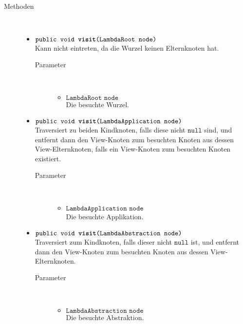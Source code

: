 \begin{description}
\item[Methoden] \hfill \\
	\vspace{-.8cm}
	\begin{itemize}
		\item $\texttt{public void \textbf{visit}(LambdaRoot node)}$ \\ Kann nicht eintreten, da die Wurzel keinen Elternknoten hat.
		\begin{description}
			\item[Parameter] \hfill \\
			\vspace{-.8cm}
			\begin{itemize}
				\item $\texttt{LambdaRoot node}$ \\ Die besuchte Wurzel.
			\end{itemize}
		\end{description}
				
		\item $\texttt{public void \textbf{visit}(LambdaApplication node)}$ \\ Traversiert zu beiden Kindknoten, falls diese nicht $\texttt{null}$ sind, und entfernt dann den View-Knoten zum besuchten Knoten aus dessen View-Elternknoten, falls ein View-Knoten zum besuchten Knoten existiert.
		\begin{description}
			\item[Parameter] \hfill \\
			\vspace{-.8cm}
			\begin{itemize}
				\item $\texttt{LambdaApplication node}$ \\ Die besuchte Applikation.
			\end{itemize}
		\end{description}
		
		\item $\texttt{public void \textbf{visit}(LambdaAbstraction node)}$ \\ Traversiert zum Kindknoten, falls dieser nicht $\texttt{null}$ ist, und entfernt dann den View-Knoten zum besuchten Knoten aus dessen View-Elternknoten.
		\begin{description}
			\item[Parameter] \hfill \\
			\vspace{-.8cm}
			\begin{itemize}
				\item $\texttt{LambdaAbstraction node}$ \\ Die besuchte Abstraktion.
			\end{itemize}
		\end{description}
		

\end{itemize}
\end{description}
